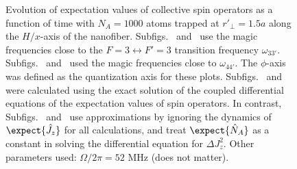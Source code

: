 \documentclass[]{report}
\begin{document}
\begin{figure}
\caption{Evolution of expectation values of collective spin operators as a function of time with $ N_A=1000 $ atoms trapped at $ r'\!_\perp =1.5a $ along the $ H/x $-axis of the nanofiber. Subfigs.~\protect{} and~\protect{} use the magic frequencies close to the $ F=3\leftrightarrow F'=3 $ transition frequency $ \omega_{33'} $. Subfigs.~\protect{} and~\protect{} used the magic frequencies close to $ \omega_{44'} $. The $ \phi $-axis was defined as the quantization axis for these plots. Subfigs.~\protect{} and~\protect{} were calculated using the exact solution of the coupled differential equations of the expectation values of spin operators. In contrast, Subfigs.~\protect{} and~\protect{} use approximations by ignoring the dynamics of $ \expect{\hat{J}_z} $ for all calculations, and treat $ \expect{\hat{N}_A} $ as a constant in solving the differential equation for $ \Delta J_z^2 $. Other parameters used: $ \Omega/2\pi=52 $ MHz (does not matter). }\label{fig:clockdynamics_m_yq_rp1d5}
\end{figure}
\end{document}
